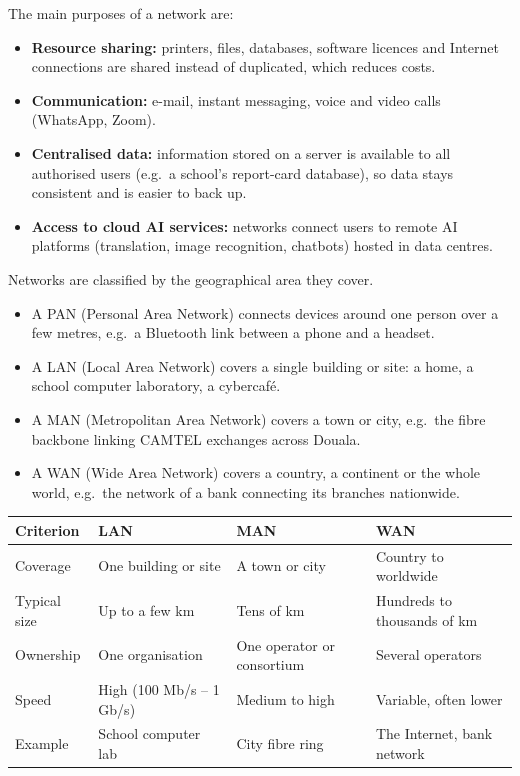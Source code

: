 \documentclass[11pt]{article}
\newcommand{\cle}[1]{{\popxbold\color{popdark}#1}}
\newcounter{popsec}
\newcounter{popsub}
\newcommand{\courssub}[1]{%
  \stepcounter{popsub}%
  \par\vspace{9pt}\noindent{\popxbold\fontsize{11.5}{13}\selectfont\color{popink}{\color{poporange}\thepopsec.\thepopsub}\hspace{6pt}#1}\par\nopagebreak\vspace{4pt}
}
\begin{document}
The main purposes of a network are:
\begin{itemize}
\item \textbf{Resource sharing:} printers, files, databases, software licences and Internet connections are shared instead of duplicated, which reduces costs.
\item \textbf{Communication:} e-mail, instant messaging, voice and video calls (WhatsApp, Zoom).
\item \textbf{Centralised data:} information stored on a server is available to all authorised users (e.g.\ a school's report-card database), so data stays consistent and is easier to back up.
\item \textbf{Access to cloud AI services:} networks connect users to remote AI platforms (translation, image recognition, chatbots) hosted in data centres.
\end{itemize}

\courssub{Types of Networks by Scale}

Networks are classified by the geographical area they cover.

\begin{definition}
\begin{itemize}
\item A \cle{PAN} (Personal Area Network) connects devices around one person over a few metres, e.g.\ a Bluetooth link between a phone and a headset.
\item A \cle{LAN} (Local Area Network) covers a single building or site: a home, a school computer laboratory, a cybercafé.
\item A \cle{MAN} (Metropolitan Area Network) covers a town or city, e.g.\ the fibre backbone linking CAMTEL exchanges across Douala.
\item A \cle{WAN} (Wide Area Network) covers a country, a continent or the whole world, e.g.\ the network of a bank connecting its branches nationwide.
\end{itemize}
\end{definition}

\begin{aretenir}
\begin{center}
\begin{tabularx}{\linewidth}{|l|X|X|X|}
\hline
\rowcolor{popblueL} \textbf{Criterion} & \textbf{LAN} & \textbf{MAN} & \textbf{WAN} \\
\hline
Coverage & One building or site & A town or city & Country to worldwide \\
\hline
Typical size & Up to a few km & Tens of km & Hundreds to thousands of km \\
\hline
Ownership & One organisation & One operator or consortium & Several operators \\
\hline
Speed & High (100 Mb/s -- 1 Gb/s) & Medium to high & Variable, often lower \\
\hline
Example & School computer lab & City fibre ring & The Internet, bank network \\
\hline
\end{tabularx}
\end{center}
\end{aretenir}
\end{document}
